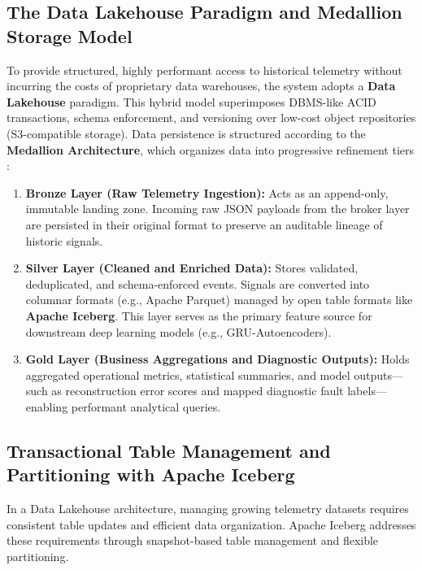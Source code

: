 \subsection{The Data Lakehouse Paradigm and Medallion Storage Model}

To provide structured, highly performant access to historical telemetry without incurring the costs of proprietary data warehouses, the system adopts a \textbf{Data Lakehouse} paradigm.
This hybrid model superimposes DBMS-like ACID transactions, schema enforcement, and versioning over low-cost object repositories (S3-compatible storage).
Data persistence is structured according to the \textbf{Medallion Architecture}, which organizes data into progressive refinement tiers \cite{mohna2024medallion}:

\begin{enumerate}
    \item \textbf{Bronze Layer (Raw Telemetry Ingestion):}
    Acts as an append-only, immutable landing zone.
    Incoming raw JSON payloads from the broker layer are persisted in their original format to preserve an auditable lineage of historic signals.

    \item \textbf{Silver Layer (Cleaned and Enriched Data):}
    Stores validated, deduplicated, and schema-enforced events.
    Signals are converted into columnar formats (e.g., Apache Parquet) managed by open table formats like \textbf{Apache Iceberg}.
    This layer serves as the primary feature source for downstream deep learning models (e.g., GRU-Autoencoders).

    \item \textbf{Gold Layer (Business Aggregations and Diagnostic Outputs):}
    Holds aggregated operational metrics, statistical summaries, and model outputs—such as reconstruction error scores and mapped diagnostic fault labels—enabling performant analytical queries.
\end{enumerate}

\subsection{Transactional Table Management and Partitioning with Apache Iceberg}

In a Data Lakehouse architecture, managing growing telemetry datasets requires consistent table updates and efficient data organization.
Apache Iceberg addresses these requirements through snapshot-based table management and flexible partitioning.

